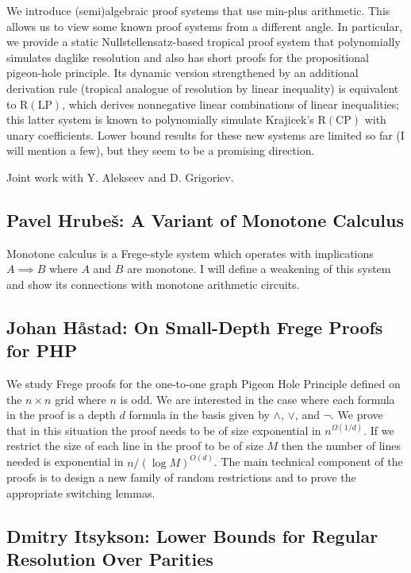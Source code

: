 \documentclass[11pt]{article}
\begin{document}
We introduce (semi)algebraic proof systems that use min-plus arithmetic. This allows us to view some known proof systems from a different angle. In particular, we provide a static Nullstellensatz-based tropical proof system that polynomially simulates daglike resolution and also has short proofs for the propositional pigeon-hole principle. Its dynamic version strengthened by an additional derivation rule (tropical analogue of resolution by linear inequality) is equivalent to $\mathrm{R}(\mathrm{LP})$, which derives nonnegative linear combinations of linear inequalities; this latter system is known to polynomially simulate Krajicek's $\mathrm{R}(\mathrm{CP})$ with unary coefficients. Lower bound results for these new systems are limited so far (I will mention a few), but they seem to be a promising direction.

Joint work with Y. Alekseev and D. Grigoriev.
\subsection*{Pavel Hrube\v{s}: A Variant of Monotone Calculus}\label{Hrubes}

Monotone calculus is a Frege-style system which operates with implications $A\implies B$ where $A$ and $B$ are monotone. I will define a weakening of this system and show its connections with monotone arithmetic circuits.


\subsection*{Johan H\aa stad: On Small-Depth Frege Proofs for PHP}\label{Hastad}

We study Frege proofs for the one-to-one graph Pigeon Hole Principle
defined on the $n\times n$ grid where $n$ is odd.
We are interested in the case where each formula
in the proof is a depth $d$ formula in the basis given by
$\land$, $\lor$, and $\neg$. We prove that in this situation the
proof needs to be of size exponential in $n^{\Omega (1/d)}$.
If we restrict the size of each line in the proof to be of
size $M$ then the number of lines needed is exponential
in $n/(\log M)^{O(d)}$.   The main technical component of
the proofs is to design a new family of random restrictions
and to prove the appropriate switching lemmas.

\subsection*{Dmitry Itsykson: Lower Bounds for Regular Resolution Over Parities}\label{Itsykson}
\end{document}
